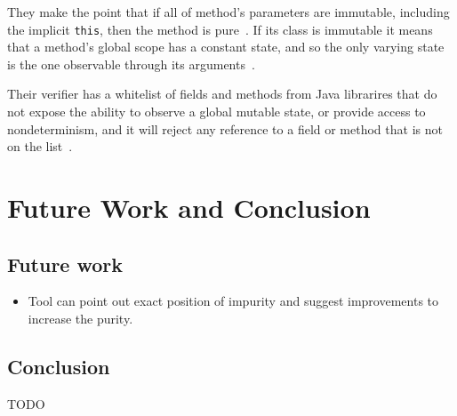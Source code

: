 \documentclass[a4paper,12pt]{article}
\begin{document}
They make the point that if all of method's parameters are immutable, including the implicit \texttt{this}, then the method is pure~\cite{purity-in-java}. %
If its class is immutable it means that a method's global scope has a constant state, and so the only varying state is the one observable through its arguments~\cite{purity-in-java}.

Their verifier has a whitelist of fields and methods from Java librarires that do not expose the ability to observe a global mutable state, or provide access to nondeterminism, and it will reject any reference to a field or method that is not on the list~\cite{purity-in-java}.

\section{Future Work and Conclusion} \label{sec:Conclusion and future Work}
\subsection{Future work} \label{sub:Future work}

\begin{itemize}
  \item Tool can point out exact position of impurity and suggest improvements to increase the purity.
\end{itemize}

\subsection{Conclusion} \label{sub:Conclusion}
TODO



\end{document}
